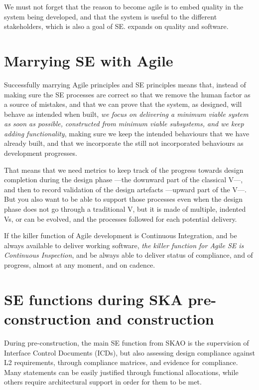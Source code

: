 \documentclass[11pt,twoside]{article}
\begin{document}
We must not forget that the reason to become agile is to embed quality in the system being developed, and that the system is useful to the different stakeholders, which is also a goal of SE. \citet{I10-1_adassxxvii} expands on quality and software.


\section{Marrying SE with Agile} %
\label{sec:se_and_agile}
Successfully marrying Agile principles and SE principles means that, instead of making sure the SE processes are correct so that we remove the human factor as a source of mistakes, and that we can prove that the system, as designed, will behave as intended when built, \emph{we focus on delivering a minimum viable system as soon as possible, constructed from minimum viable subsystems, and we keep adding functionality}, making sure we keep the intended behaviours that we have already built, and that we incorporate the still not incorporated behaviours as development progresses.	

That means that we need metrics to keep track of the progress towards design completion during the design phase ---the downward part of the classical V---, and then to record validation of the design artefacts ---upward part of the V---. But you also want to be able to support those processes even when the design phase does not go through a traditional V, but it is made of multiple, indented Vs, or can be evolved, and the processes followed for each potential delivery.

If the killer function of Agile development is Continuous Integration, and be always available to deliver working software, \emph{the killer function for Agile SE is Continuous Inspection}, and be always able to deliver status of compliance, and of progress, almost at any moment, and on cadence.	


\section{SE functions during SKA pre-construction and construction} %
\label{sec:se_functions_during_ska_pre_construction}
During pre-construction, the main SE function from SKAO is the supervision of Interface Control Documents (ICDs), but also assessing design compliance against L2 requirements, through compliance matrices, and evidence for compliance. Many statements can be easily justified through functional allocations, while others require architectural support in order for them to be met.
\end{document}
